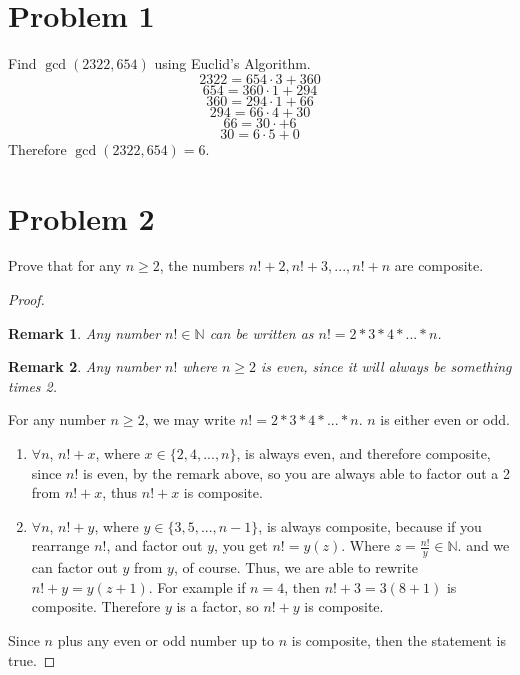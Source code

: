 \documentclass[12pt]{article}
\title{\scalebox{2}{Math 341 Exam 2}}
\author{\scalebox{1.5}{Theo Koss}}
\date{October 2020}
\newtheorem*{remark}{Remark}
\newcommand{\N}{\mathbb{N}}
\begin{document}
\maketitle
\section{Problem 1}
Find $\gcd(2322,654)$ using Euclid's Algorithm.
$$2322=654\cdot3+360$$ $$654=360\cdot1+294$$ $$360=294\cdot1+66$$ $$294=66\cdot4+30$$ $$66=30\cdot+6$$ $$30=6\cdot5+0$$ Therefore $\gcd(2322,654)=6$.
\section{Problem 2}
Prove that for any $n\geq2$, the numbers $n!+2,n!+3,...,n!+n$ are composite.
\begin{proof}
\begin{remark} Any number $n!\in\N$ can be written as $n!=2*3*4*...*n$.\end{remark}
\begin{remark} Any number $n!$ where $n\geq2$ is even, since it will always be something times 2. \end{remark}
For any number $n\geq2$, we may write $n!=2*3*4*...*n$. $n$ is either even or odd.
\begin{enumerate}
    \item $\forall n$, $n!+x$, where $x\in\{2,4,...,n\}$, is always even, and therefore composite, since $n!$ is even, by the remark above, so you are always able to factor out a 2 from $n!+x$, thus $n!+x$ is composite.
    \item $\forall n$, $n!+y$, where $y\in\{3,5,...,n-1\}$, is always composite, because if you rearrange $n!$, and factor out $y$, you get $n!=y(z)$. Where $z=\frac{n!}{y}\in\N$. and we can factor out $y$ from $y$, of course. Thus, we are able to rewrite $n!+y=y(z+1)$. For example if $n=4$, then $n!+3=3(8+1)$ is composite. Therefore $y$ is a factor, so $n!+y$ is composite.
\end{enumerate}
Since $n$ plus any even or odd number up to $n$ is composite, then the statement is true.
\end{proof}
\end{document}
